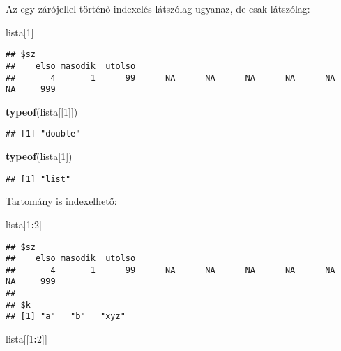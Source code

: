 \documentclass[]{book}
\newenvironment{Shaded}{\begin{snugshade}}{\end{snugshade}}
\newcommand{\DecValTok}[1]{\textcolor[rgb]{0.00,0.00,0.81}{#1}}
\newcommand{\KeywordTok}[1]{\textcolor[rgb]{0.13,0.29,0.53}{\textbf{#1}}}
\newcommand{\NormalTok}[1]{#1}
\newcommand{\OperatorTok}[1]{\textcolor[rgb]{0.81,0.36,0.00}{\textbf{#1}}}
\begin{document}
Az egy zárójellel történő indexelés látszólag ugyanaz, de csak látszólag:

\begin{Shaded}
\begin{Highlighting}[]
\NormalTok{lista[}\DecValTok{1}\NormalTok{]}
\end{Highlighting}
\end{Shaded}

\begin{verbatim}
## $sz
##    elso masodik  utolso                                                         
##       4       1      99      NA      NA      NA      NA      NA      NA     999
\end{verbatim}

\begin{Shaded}
\begin{Highlighting}[]
\KeywordTok{typeof}\NormalTok{(lista[[}\DecValTok{1}\NormalTok{]])}
\end{Highlighting}
\end{Shaded}

\begin{verbatim}
## [1] "double"
\end{verbatim}

\begin{Shaded}
\begin{Highlighting}[]
\KeywordTok{typeof}\NormalTok{(lista[}\DecValTok{1}\NormalTok{])}
\end{Highlighting}
\end{Shaded}

\begin{verbatim}
## [1] "list"
\end{verbatim}

Tartomány is indexelhető:

\begin{Shaded}
\begin{Highlighting}[]
\NormalTok{lista[}\DecValTok{1}\OperatorTok{:}\DecValTok{2}\NormalTok{]}
\end{Highlighting}
\end{Shaded}

\begin{verbatim}
## $sz
##    elso masodik  utolso                                                         
##       4       1      99      NA      NA      NA      NA      NA      NA     999 
## 
## $k
## [1] "a"   "b"   "xyz"
\end{verbatim}

\begin{Shaded}
\begin{Highlighting}[]
\NormalTok{lista[[}\DecValTok{1}\OperatorTok{:}\DecValTok{2}\NormalTok{]]}
\end{Highlighting}
\end{Shaded}
\end{document}
